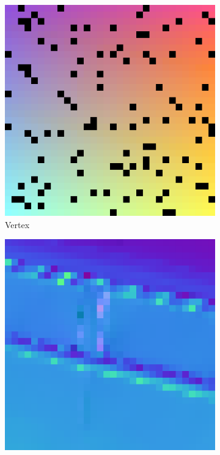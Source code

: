 \begin{figure}
\begin{subfigure}[b]{0.24\linewidth}
	\end{subfigure}	
	
	\begin{subfigure}[b]{0.24\linewidth}
		\includegraphics[width=\linewidth]{./Figures/gcnn_synthetic/eval_9_input.png}
		\caption{Vertex}
	\end{subfigure}
	\begin{subfigure}[b]{0.24\linewidth}
		\includegraphics[width=\linewidth]{./Figures/gcnn_synthetic/eval_9_normal_GT.png}

\end{subfigure}
\end{figure}
